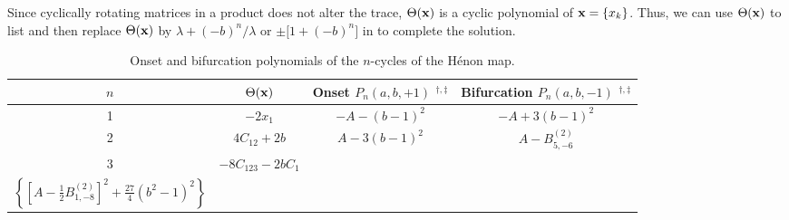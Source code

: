 \documentclass[preprint]{revtex4-1}
\begin{document}
Since cyclically rotating matrices in a product does not alter the trace,
$\Theta(\mathbf{x})$ is a cyclic polynomial of $\mathbf{x} = \{ x_k \}$.
%
Thus, we can use $\Theta(\mathbf{x})$ to list 
and then replace $\Theta(\mathbf{x})$ by $\lambda + (-b)^n/\lambda$
or $\pm\big[ 1 + (-b)^n \big]$
in  to complete the solution.



\newcommand{\BB}[2]{B^{(2)}_{#1,#2}}
\newcommand{\BBB}[3]{B^{(4)}_{#1,#2,#3}}
\newcommand{\BBBB}[4]{B^{(6)}_{#1,#2,#3,#4}}

\begin{table}[h]\footnotesize
\caption{Onset and bifurcation polynomials of the $n$-cycles of the H\'enon map.}
\begin{center}
\begin{tabular*}{\linewidth}{c c c c}
\hline
$n$
& $\Theta(\mathbf{x})$
& Onset $P_n(a, b, +1)$ $^{\dagger, \ddagger}$
& Bifurcation $P_n(a, b, -1)$ $^{\dagger, \ddagger}$ \\
\hline
1
& $-2 x_1$
& $-A - (b-1)^2$
& $-A + 3(b-1)^2$ \\
2
& $4 C_{12} + 2 b$
& $A-3 (b-1)^2$
& $A - \BB{5}{-6}$ \\
3
&
  $-8C_{123}-2b C_1$
&
  \begin{minipage}[h]{.35\linewidth}
  $\left( -A + \BB{7}{10} \right)$ \\
  $\left\{ \left[ A -\frac{1}{2}\BB{1}{-8} \right]^2 + \frac{27}{4} (b^2-1)^2 \right\}$
  \end{minipage}


\end{tabular*}
\end{center}
\end{table}
\end{document}

